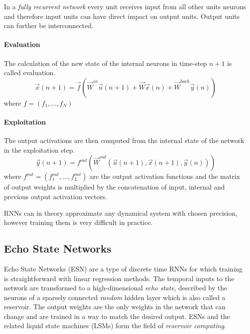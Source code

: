 In a \emph{fully recurrent network} every unit receives input from all other units neurons and therefore input units can have direct impact on output units. Output units can further be interconnected.\par

\paragraph{Evaluation}
The calculation of the new state of the internal neurons in time-step $n+1$ is called evaluation. 
\[
\vec{x}(n+1)=\vec{f}(\vec{W}^{in}\vec{u}(n+1)+\vec{W}\vec{x}(n)+\vec{W}^{back}\vec{y}(n))
\]
where $f=(f_1,...,f_N)$
\paragraph{Exploitation}
The output activations are then computed from the internal state of the network in the exploitation step.
\[
\vec{y}(n+1)=f^{out}(\vec{W}^{out}(\vec{u}(n+1),\vec{x}(n+1),\vec{y}(n)))
\]
where $f^{out}=(f^{out}_1,...,f^{out}_L)$ are the output activation functions and the matrix of output weights is multiplied by the concatenation of input, internal and previous output activation vectors.\par

RNNs can in theory approximate any dynamical system with chosen precision, however training them is very difficult in practice. 

\subsection*{Echo State Networks}
Echo State Networks (ESN) are a type of discrete time RNNs for which training is straightforward with linear regression methods.  The temporal inputs to the network are transformed to a high-dimensional \emph{echo state}, described by the neurons of a sparsely connected \emph{random} hidden layer which is also called a reservoir. The output weights are the only weights in the network that can change and are trained in a way to match the desired output. ESNs and the related liquid state machines (LSMs) form the field of \emph{reservoir computing}.

